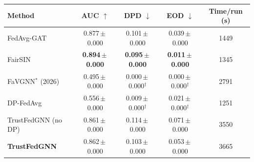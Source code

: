 \begin{tabular}{lcccc}
\toprule
Method & AUC $\uparrow$ & DPD $\downarrow$ & EOD $\downarrow$ & Time/run (s) \\
\midrule
FedAvg-GAT & 0.877\,$\pm$\,0.000 & 0.101\,$\pm$\,0.000 & 0.039\,$\pm$\,0.000 & 1449 \\
FairSIN & \textbf{0.894\,$\pm$\,0.000} & \textbf{0.095\,$\pm$\,0.000} & \textbf{0.011\,$\pm$\,0.000} & 1345 \\
FaVGNN$^{\ast}$ (2026) & 0.495\,$\pm$\,0.000 & 0.000\,$\pm$\,0.000$^{\dagger}$ & 0.000\,$\pm$\,0.000$^{\dagger}$ & 2791 \\
DP-FedAvg & 0.556\,$\pm$\,0.000 & 0.009\,$\pm$\,0.000$^{\dagger}$ & 0.021\,$\pm$\,0.000$^{\dagger}$ & 1251 \\
TrustFedGNN (no DP) & 0.861\,$\pm$\,0.000 & 0.114\,$\pm$\,0.000 & 0.071\,$\pm$\,0.000 & 3550 \\
\textbf{TrustFedGNN} & 0.862\,$\pm$\,0.000 & 0.103\,$\pm$\,0.000 & 0.053\,$\pm$\,0.000 & 3665 \\
\bottomrule
\end{tabular}